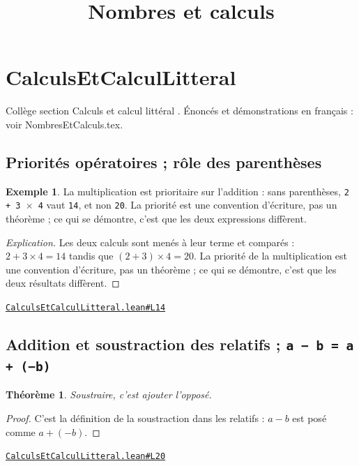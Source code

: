 \documentclass[11pt,a4paper]{article}
\title{Nombres et calculs}
\date{}
\theoremstyle{definition}
\newtheorem{exemple}{Exemple}
\theoremstyle{plain}
\newtheorem{theoreme}{Théorème}
\newenvironment{explication}{\begin{proof}[Explication]}{\end{proof}}
\newcommand{\source}[2]{\par\smallskip\noindent\hfill{\footnotesize\href{#1}{\texttt{#2}}}\par\smallskip}
\begin{document}
\maketitle
\sloppy

\section{CalculsEtCalculLitteral}

\noindent
Collège \textemdash{} section \og{} Calculs et calcul littéral \fg{}.
Énoncés et démonstrations en français : voir NombresEtCalculs.tex.

\subsection{Priorités opératoires ; rôle des parenthèses}

\begin{exemple}
La multiplication est prioritaire sur l'addition : sans parenthèses, \texttt{2 + 3 \(\times\) 4}
vaut \texttt{14}, et non \texttt{20}. La priorité est une convention d'écriture, pas un théorème ;
ce qui se démontre, c'est que les deux expressions diffèrent.
\end{exemple}

\begin{explication}
Les deux calculs sont menés à leur terme et comparés : $2 + 3 \times 4 = 14$ tandis
que $(2+3) \times 4 = 20$. La priorité de la multiplication est une convention d'écriture,
pas un théorème ; ce qui se démontre, c'est que les deux résultats diffèrent.
\end{explication}
\source{https://github.com/Commutator-IO/learn-lean/blob/main/courses/01-college/01-nombres-et-calculs/CalculsEtCalculLitteral.lean\#L14}{CalculsEtCalculLitteral.lean\#L14}

\subsection{Addition et soustraction des relatifs ; \texttt{a − b = a + (−b)}}

\begin{theoreme}
Soustraire, c'est ajouter l'opposé.
\end{theoreme}

\begin{proof}
C'est la définition de la soustraction dans les relatifs : $a - b$ est posé comme
$a + (-b)$.
\end{proof}
\source{https://github.com/Commutator-IO/learn-lean/blob/main/courses/01-college/01-nombres-et-calculs/CalculsEtCalculLitteral.lean\#L20}{CalculsEtCalculLitteral.lean\#L20}
\end{document}
